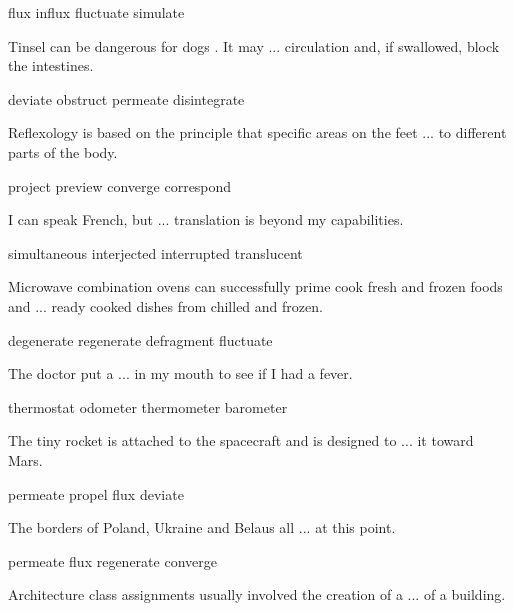 \documentclass{exam}
\begin{document}
\begin{questions}
\begin{oneparchoices}
\choice flux
\choice influx
\correctchoice fluctuate
\choice simulate 
\end{oneparchoices}
\question Tinsel can be dangerous for dogs . It may ... circulation and, if swallowed, block the intestines.\\
\begin{oneparchoices}
\choice deviate
\correctchoice obstruct
\choice permeate
\choice disintegrate 
\end{oneparchoices}
\question Reflexology is based on the principle that specific areas on the feet ... to different parts of the body.\\
\begin{oneparchoices}
\choice project
\choice preview
\choice converge
\correctchoice correspond
\end{oneparchoices}
\question  I can speak French, but ... translation is beyond my capabilities.\\
\begin{oneparchoices}
\correctchoice simultaneous
\choice interjected
\choice interrupted
\choice translucent
\end{oneparchoices}
\question Microwave combination ovens can successfully prime cook fresh and frozen foods and ... ready cooked dishes from chilled and frozen.\\
\begin{oneparchoices}
\choice degenerate
\correctchoice regenerate
\choice defragment
\choice fluctuate
\end{oneparchoices}
\question The doctor put a ... in my mouth to see if I had a fever.\\
\begin{oneparchoices}
\choice thermostat
\choice odometer
\correctchoice thermometer
\choice barometer
\end{oneparchoices}
\question The tiny rocket is attached to the spacecraft and is designed to ... it toward Mars.\\
\begin{oneparchoices}
\choice permeate
\correctchoice propel
\choice flux
\choice deviate
\end{oneparchoices}
\question The borders of Poland, Ukraine and Belaus all ... at this point.\\
\begin{oneparchoices}
\choice permeate
\choice flux
\choice regenerate
\correctchoice converge
\end{oneparchoices}
\question Architecture class assignments usually involved the creation of a ... of a building.\\

\end{questions}
\end{document}
